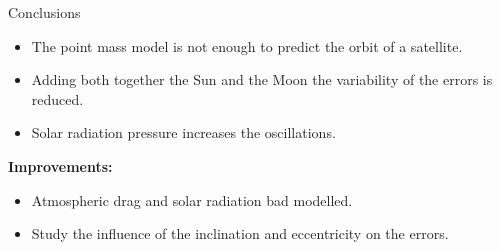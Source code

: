 \documentclass{beamer} %
\begin{document}
\begin{frame}{Conclusions}
  \begin{itemize}
    \item The point mass model is not enough to predict the orbit of a satellite.
    \item Adding both together the Sun and the Moon the variability of the errors is reduced.
    \item Solar radiation pressure increases the oscillations.
  \end{itemize}
  \vspace{0.5cm}\pause
  \textbf{Improvements:}
  \begin{itemize}
    \item Atmospheric drag and solar radiation bad modelled.
    \item Study the influence of the inclination and eccentricity on the errors.
  \end{itemize}
\end{frame}
\end{document}
